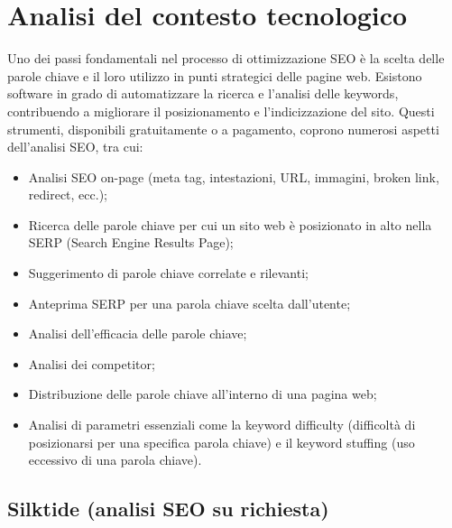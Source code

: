 \chapter{Analisi del contesto tecnologico}
\label{cap:analisi-soluzioni-esistenti}

\par Uno dei passi fondamentali nel processo di ottimizzazione SEO è la scelta delle parole chiave e il loro utilizzo in punti strategici delle pagine web. Esistono software in grado di automatizzare la ricerca e l’analisi delle keywords, contribuendo a migliorare il posizionamento e l’indicizzazione del sito. Questi strumenti, disponibili gratuitamente o a pagamento, coprono numerosi aspetti dell’analisi SEO, tra cui:
\begin{itemize}
    \item Analisi SEO on-page (meta tag, intestazioni, URL, immagini, broken link, redirect, ecc.);
    \item Ricerca delle parole chiave per cui un sito web è posizionato in alto nella SERP (Search Engine Results Page);
    \item Suggerimento di parole chiave correlate e rilevanti;
    \item Anteprima SERP per una parola chiave scelta dall'utente;
    \item Analisi dell’efficacia delle parole chiave;
    \item Analisi dei competitor;
    \item Distribuzione delle parole chiave all’interno di una pagina web;
    \item Analisi di parametri essenziali come la keyword difficulty (difficoltà di posizionarsi per una specifica parola chiave) e il keyword stuffing (uso eccessivo di una parola chiave).
\end{itemize}

\section{Silktide (analisi SEO su richiesta)}

